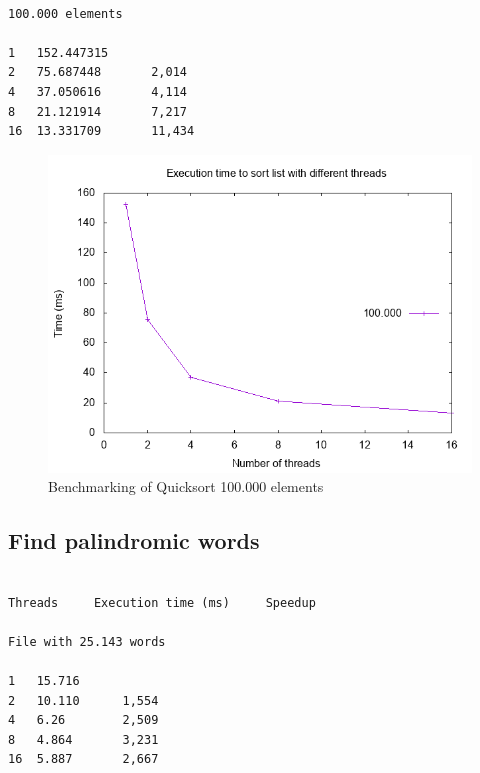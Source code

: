 \documentclass{article}
\begin{document}
\begin{verbatim}
 
100.000 elements

1   152.447315
2   75.687448       2,014
4   37.050616       4,114
8   21.121914       7,217	
16  13.331709       11,434

\end{verbatim}

\begin{figure}[h]
\centering
\includegraphics[scale=0.5]{Quicksort - 100k.png}
\caption{Benchmarking of Quicksort 100.000 elements}
\end{figure}      
\clearpage

\subsection{Find palindromic words }

\begin{verbatim}

Threads     Execution time (ms)     Speedup

File with 25.143 words

1   15.716
2   10.110      1,554
4   6.26        2,509
8   4.864       3,231 
16  5.887       2,667
\end{verbatim}
\end{document}
